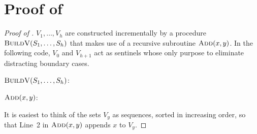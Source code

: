 \documentclass[kpfonts]{patmorin}
\newcommand{\snote}[1]{\fcolorbox{red}{yellow}{#1}}
\newcommand{\pnote}[1]{\ \newline\noindent\fcolorbox{red}{yellow}{\begin{minipage}{\textwidth}#1\end{minipage}}}
\let\ge\geqslant
\begin{document}
  



\appendix

\section{Proof of }


\begin{proof}[Proof of ]
  $V_1,\ldots,V_{h}$ are constructed incrementally by a procedure $\textsc{BuildV}(S_1,\ldots,S_h)$ that makes use of a recursive subroutine $\textsc{Add}(x, y)$.  In the following code, $V_0$ and $V_{h+1}$ act as sentinels whose only purpose to eliminate distracting boundary cases.
  
  \noindent$\textsc{BuildV}(S_1,\ldots,S_h)$:
  \begin{algorithmic}[1]
        \ENDIF
      \ENDFOR
    \ENDFOR
  \end{algorithmic}
  
  \noindent$\textsc{Add}(x, y)$:
  \begin{algorithmic}[1]
      \IF{$|V_y|\ge 4$}      
        \ENDIF
      \ENDIF
    \ENDIF
  \end{algorithmic}

  It is easiest to think of the sets $V_y$ as sequences, sorted in increasing order, so that Line~2 in $\textsc{Add}(x,y)$ appends $x$ to $V_y$.
  

\end{proof}
\end{document}
